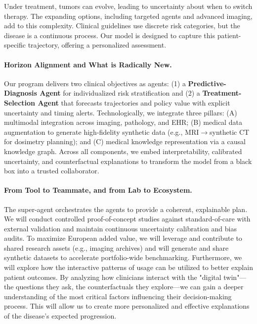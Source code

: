 \documentclass[11pt, a4paper]{article}
\begin{document}
Under treatment, tumors can evolve, leading to uncertainty about when to switch therapy. The expanding options, including targeted agents and advanced imaging, add to this complexity. Clinical guidelines use discrete risk categories, but the disease is a continuous process. Our model is designed to capture this patient-specific trajectory, offering a personalized assessment.

\paragraph{Horizon Alignment and What is Radically New.} Our program delivers two clinical objectives as agents: (1) a \textbf{Predictive-Diagnosis Agent} for individualized risk stratification and (2) a \textbf{Treatment-Selection Agent} that forecasts trajectories and policy value with explicit uncertainty and timing alerts. Technologically, we integrate three pillars: (A) multimodal integration across imaging, pathology, and EHR; (B) medical data augmentation to generate high-fidelity synthetic data (e.g., MRI$\rightarrow$synthetic CT for dosimetry planning); and (C) medical knowledge representation via a causal knowledge graph. Across all components, we embed interpretability, calibrated uncertainty, and counterfactual explanations to transform the model from a black box into a trusted collaborator.

\paragraph{From Tool to Teammate, and from Lab to Ecosystem.} The super-agent orchestrates the agents to provide a coherent, explainable plan. We will conduct controlled proof-of-concept studies against standard-of-care with external validation and maintain continuous uncertainty calibration and bias audits. To maximize European added value, we will leverage and contribute to shared research assets (e.g., imaging archives) and will generate and share synthetic datasets to accelerate portfolio-wide benchmarking. Furthermore, we will explore how the interactive patterns of usage can be utilized to better explain patient outcomes. By analyzing how clinicians interact with the "digital twin"—the questions they ask, the counterfactuals they explore—we can gain a deeper understanding of the most critical factors influencing their decision-making process. This will allow us to create more personalized and effective explanations of the disease's expected progression.
\end{document}
